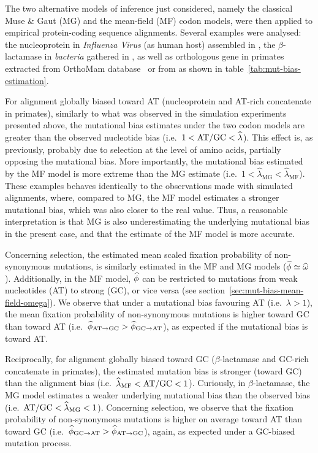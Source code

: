 \documentclass{article}
\begin{document}
The two alternative models of inference just considered, namely the classical Muse \& Gaut ({MG}) and the mean-field ({MF}) codon models, were then applied to empirical protein-coding sequence alignments.
Several examples were analysed: the nucleoprotein in \textit{Influenza Virus} (as human host) assembled in \citet{Bloom2017}, the $\beta$-lactamase in \textit{bacteria} gathered in \citet{Bloom2014}, as well as orthologous gene in primates extracted from OrthoMam database~\citep{Scornavacca2019} or from \citet{Perelman2011} as shown in table~\ref{tab:mut-bias-estimation}.

For alignment globally biased toward AT (nucleoprotein and AT-rich concatenate in primates), similarly to what was observed in the simulation experiments presented above, the mutational bias estimates under the two codon models are greater than the observed nucleotide bias (i.e.~$1 < \text{AT/GC} < \widehat{\lambda}$).
This effect is, as previously, probably due to selection at the level of amino acids, partially opposing the mutational bias.
More importantly, the mutational bias estimated by the {MF} model is more extreme than the {MG} estimate (i.e.~$1 < \widehat{\lambda}_{\text{{MG}}} < \widehat{\lambda}_{\text{{MF}}}$).
These examples behaves identically to the observations made with simulated alignments, where, compared to {MG}, the {MF} model estimates a stronger mutational bias, which was also closer to the real value.
Thus, a reasonable interpretation is that {MG} is also underestimating the underlying mutational bias in the present case, and that the estimate of the {MF} model is more accurate.

Concerning selection, the estimated mean scaled fixation probability of {non-synonymous} mutations, is similarly estimated in the {MF} and {MG} models ($\widehat{\phi} \simeq \widehat{\omega}$).
Additionally, in the {MF} model, $\widehat{\phi}$ can be restricted to mutations from weak nucleotides (AT) to strong (GC), or vice versa (see section~\ref{sec:mut-bias-mean-field-omega}).
We observe that under a mutational bias favouring AT (i.e.~$\lambda > 1$), the mean fixation probability of {non-synonymous} mutations is higher toward GC than toward AT (i.e.~$\widehat{\phi}_{\text{AT} \rightarrow \text{GC}} > \widehat{\phi}_{\text{GC} \rightarrow \text{AT}}$), as expected if the mutational bias is toward AT.

Reciprocally, for alignment globally biased toward GC ($\beta$-lactamase and GC-rich concatenate in primates), the estimated mutation bias is stronger (toward GC) than the alignment bias (i.e.~$\widehat{\lambda}_{\text{{MF}}} < \text{AT/GC} < 1$).
Curiously, in $\beta$-lactamase, the {MG} model estimates a weaker underlying mutational bias than the observed bias (i.e.~$ \text{AT/GC} < \widehat{\lambda}_{\text{{MG}}} < 1$).
Concerning selection, we observe that the fixation probability of {non-synonymous} mutations is higher on average toward AT than toward GC (i.e.~$\widehat{\phi}_{\text{GC} \rightarrow \text{AT}} > \widehat{\phi}_{\text{AT} \rightarrow \text{GC}}$), again, as expected under a GC-biased mutation process.
\end{document}

